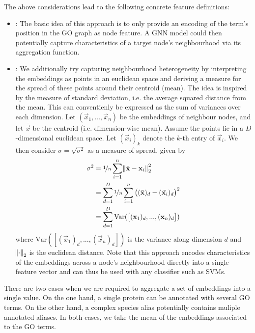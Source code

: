 \documentclass[
	fontsize=10pt, %
	twoside=false, %
	secnumdepth=1, %
  toc=indentunnumbered %
]{kaobook}
\begin{document}
The above considerations lead to the following concrete feature definitions:
\begin{itemize}
\item {}: The basic idea of this approach is to only provide an
  encoding of the term's position in the GO graph as node feature. A GNN model
  could then potentially capture characteristics of a target node's
  neighbourhood via its aggregation function.
\item {}: We additionally try capturing neighbourhood
  heterogeneity by interpreting the embeddings as points in an euclidean space
  and deriving a measure for the spread of these points around their centroid
  (mean). The idea is inspired by the measure of standard deviation, i.e. the
  average squared distance from the mean. This can conventienly be expressed as
  the sum of variances over each dimension. Let $(\vec x_1, ..., \vec x_n)$ be
  the embeddings of neighbour nodes, and let $\bar{\vec x}$ be the centroid
  (i.e. dimension-wise mean). Assume the points lie in a $D$-dimensional
  euclidean space. Let $(\vec x_i)_k$ denote the $k$-th entry of $\vec x_i$. We
  then consider $\sigma = \sqrt{\sigma^2}$ as a measure of spread, given by
  \begin{align*}
    \sigma^2 &= \nicefrac{1}{n} \sum_{i=1}^n \norm{\bar{\mathbf{x}} - \mathbf{x}_i}_2^2 \\
             &= \sum_{d=1}^D \nicefrac{1}{n} \sum_{i=1}^n
               \left( (\bar{\mathbf{x}})_d - (\bar{\mathbf{x}_i})_d\right)^2 \\
             &= \sum_{d=1}^D \text{Var}(\left[
               (\mathbf{x}_1)_d, ..., (\mathbf{x}_n)_d
               \right])
  \end{align*}
  where $\text{Var}(\left[(\vec x_1)_d, ..., (\vec x_n)_d \right])$ is the
  variance along dimension $d$ and $\norm{\cdot}_2$ is the euclidean distance.
  Note that this approach encodes characteristics of the embeddings across a
  node's neighbourhood directly into a single feature vector and can thus be
  used with any classifier such as SVMs.
\end{itemize}


There are two cases when we are required to
aggregate a set of embeddings into a single value. On the one hand, a single
protein can be annotated with several GO terms. On the other hand, a complex
species alias potentially contains muliple annotated aliases. In both cases,
we take the mean of the embeddings associated to the GO terms.
\end{document}
